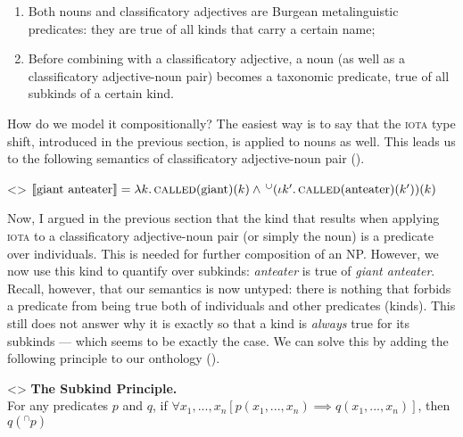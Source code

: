 \documentclass[a4paper, 12pt]{article}
\begin{document}
\begin{enumerate}
    \item Both nouns and classificatory adjectives are Burgean metalinguistic predicates: they are true of all kinds that carry a certain name;
    \item Before combining with a classificatory adjective, a noun (as well as a classificatory adjective-noun pair) becomes a taxonomic predicate, true of all subkinds of a certain kind.
\end{enumerate}

How do we model it compositionally? The easiest way is to say that the \textsc{iota} type shift, introduced in the previous section, is applied to nouns as well. This leads us to the following semantics of classificatory adjective-noun pair (\nextx).

\ex<>
$\llbracket \text{giant anteater} \rrbracket = \lambda k.\, \textsc{called}(\text{giant})(k)\land \,^\cup(\iota k'.\, \textsc{called}(\text{anteater})(k'))(k)$\footnotemark
\xe


Now, I argued in the previous section that the kind that results when applying \textsc{iota} to a classificatory adjective-noun pair (or simply the noun) is a predicate over individuals. This is needed for further composition of an NP. However, we now use this kind to quantify over subkinds: \textit{anteater} is true of \textit{giant anteater}. Recall, however, that our semantics is now untyped: there is nothing that forbids a predicate from being true both of individuals and other predicates (kinds). This still does not answer why it is exactly so that a kind is \emph{always} true for its subkinds --- which seems to be exactly the case. We can solve this by adding the following principle to our onthology (\nextx).

\ex<>
    \textbf{The Subkind Principle.}\\For any predicates $p$ and $q$, if $\forall x_1,...,x_n[p(x_1,...,x_n)\implies q(x_1,...,x_n)]$, then $q(^\cap p)$\footnotemark{}
\xe

\end{document}
